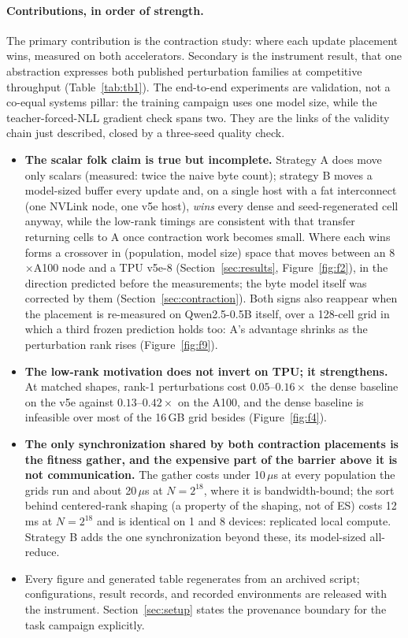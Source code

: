 \paragraph{Contributions, in order of strength.} The primary
contribution is the contraction study: where each update placement wins,
measured on both accelerators. Secondary is the instrument result, that
one abstraction expresses both published perturbation families at
competitive throughput (Table~\ref{tab:tb1}). The end-to-end experiments
are validation, not a co-equal systems pillar: the training campaign uses one
model size, while the teacher-forced-NLL gradient check spans two. They are the links of the
validity chain just described, closed by a three-seed quality check.
\begin{itemize}
  \item \textbf{The scalar folk claim is true but incomplete.} Strategy
    A does move only scalars (measured: twice the naive byte count);
    strategy B moves a model-sized buffer every update
    and, on a single host with a fat interconnect (one NVLink node, one v5e
    host), \emph{wins} every dense and seed-regenerated cell anyway, while the
    low-rank timings are consistent with that transfer returning cells to A
    once contraction work becomes small. Where
    each wins forms a
    crossover in (population, model size) space that moves between an
    8$\times$A100 node and a TPU v5e-8 (Section~\ref{sec:results},
    Figure~\ref{fig:f2}), in the direction predicted before the
    measurements; the byte model itself was corrected by them
    (Section~\ref{sec:contraction}). Both signs also
    reappear when the placement is re-measured on Qwen2.5-0.5B itself, over
    a 128-cell grid in which a third frozen prediction holds too: A's
    advantage shrinks as the perturbation rank rises
    (Figure~\ref{fig:f9}).
  \item \textbf{The low-rank motivation does not invert on TPU; it
    strengthens.} At matched shapes, rank-1 perturbations cost
    $0.05$--$0.16\times$ the dense baseline on the v5e against
    $0.13$--$0.42\times$ on the A100, and the dense baseline is infeasible
    over most of the 16\,GB grid besides (Figure~\ref{fig:f4}).
  \item \textbf{The only synchronization shared by both contraction
    placements is the fitness gather, and the expensive part of the
    barrier above it is not communication.} The gather costs under
    10\,$\mu$s at every population the grids run and about 20\,$\mu$s at
    $N{=}2^{18}$, where it is bandwidth-bound; the
    sort behind centered-rank shaping (a property of the shaping, not of
    ES) costs 12\,ms at $N{=}2^{18}$ and is identical on 1 and 8
    devices: replicated local compute. Strategy B adds the one
    synchronization beyond these, its model-sized all-reduce.
  \item Every figure and generated table regenerates from an archived script;
    configurations, result records, and recorded environments are released
    with the instrument. Section~\ref{sec:setup} states the provenance boundary
    for the task campaign explicitly.
\end{itemize}

